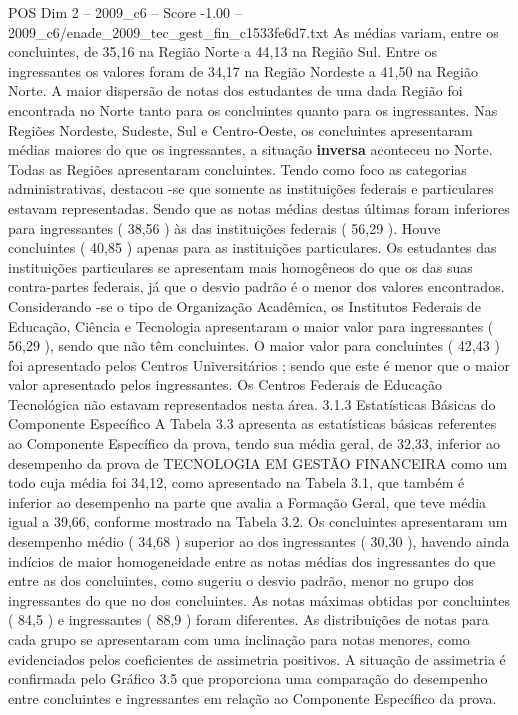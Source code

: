 \begin{textsample}{POS Dim 2 – 2009\_c6 – Score -1.00 – 2009\_c6/enade\_2009\_tec\_gest\_fin\_c1533fe6d7.txt}
As médias variam, entre os concluintes, de 35,16 na Região Norte a 44,13 na Região Sul.
Entre os ingressantes os valores foram de 34,17 na Região Nordeste a 41,50 na Região Norte.
A maior dispersão de notas dos estudantes de uma dada Região foi encontrada no Norte tanto para os concluintes quanto para os ingressantes.
Nas Regiões Nordeste, Sudeste, Sul e Centro-Oeste, os concluintes apresentaram médias maiores do que os ingressantes, a situação \textbf{inversa} aconteceu no Norte.
Todas as Regiões apresentaram concluintes.
Tendo como foco as categorias administrativas, destacou -se que somente as instituições federais e particulares estavam representadas.
Sendo que as notas médias destas últimas foram inferiores para ingressantes ( 38,56 ) às das instituições federais ( 56,29 ).
Houve concluintes ( 40,85 ) apenas para as instituições particulares.
Os estudantes das instituições particulares se apresentam mais homogêneos do que os das suas contra-partes federais, já que o desvio padrão é o menor dos valores encontrados.
Considerando -se o tipo de Organização Acadêmica, os Institutos Federais de Educação, Ciência e Tecnologia apresentaram o maior valor para ingressantes ( 56,29 ), sendo que não têm concluintes.
O maior valor para concluintes ( 42,43 ) foi apresentado pelos Centros Universitários ; sendo que este é menor que o maior valor apresentado pelos ingressantes.
Os Centros Federais de Educação Tecnológica não estavam representados nesta área. 3.1.3 Estatísticas Básicas do Componente Específico A Tabela 3.3 apresenta as estatísticas básicas referentes ao Componente Específico da prova, tendo sua média geral, de 32,33, inferior ao desempenho da prova de TECNOLOGIA EM GESTÃO FINANCEIRA como um todo cuja média foi 34,12, como apresentado na Tabela 3.1, que também é inferior ao desempenho na parte que avalia a Formação Geral, que teve média igual a 39,66, conforme mostrado na Tabela 3.2.
Os concluintes apresentaram um desempenho médio ( 34,68 ) superior ao dos ingressantes ( 30,30 ), havendo ainda indícios de maior homogeneidade entre as notas médias dos ingressantes do que entre as dos concluintes, como sugeriu o desvio padrão, menor no grupo dos ingressantes do que no dos concluintes.
As notas máximas obtidas por concluintes ( 84,5 ) e ingressantes ( 88,9 ) foram diferentes.
As distribuições de notas para cada grupo se apresentaram com uma inclinação para notas menores, como evidenciados pelos coeficientes de assimetria positivos.
A situação de assimetria é confirmada pelo Gráfico 3.5 que proporciona uma comparação do desempenho entre concluintes e ingressantes em relação ao Componente Específico da prova.

\end{textsample}
